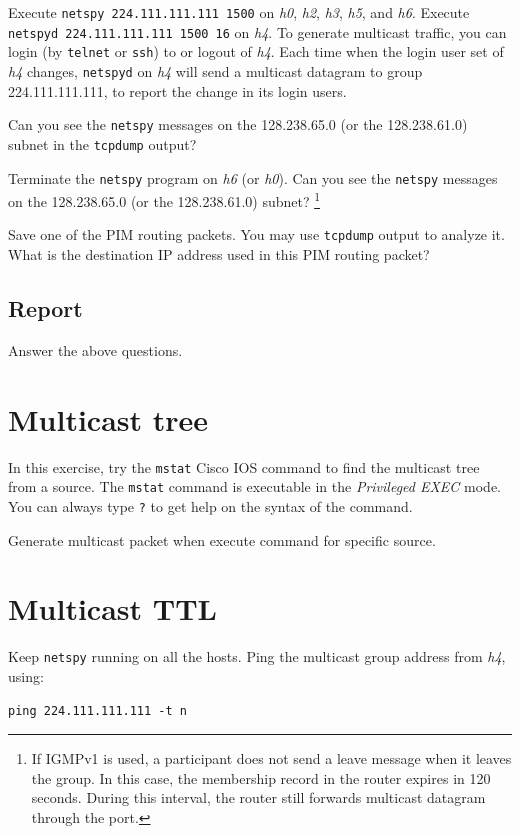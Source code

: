 \documentclass{../UTNetLab}
\begin{document}
    Execute \lstinline{netspy 224.111.111.111 1500} on \textit{h0}, \textit{h2}, \textit{h3}, \textit{h5}, and \textit{h6}.
    Execute \lstinline{netspyd 224.111.111.111 1500 16} on \textit{h4}.
    To generate multicast traffic, you can login (by \lstinline{telnet} or \lstinline{ssh}) to or logout of \textit{h4}.
    Each time when the login user set of \textit{h4} changes, \lstinline{netspyd} on \textit{h4} will send a multicast datagram to group 224.111.111.111, to report the change in its login users.

    Can you see the \lstinline{netspy} messages on the 128.238.65.0 (or the 128.238.61.0) subnet in the \lstinline{tcpdump} output? 

    Terminate the \lstinline{netspy} program on \textit{h6} (or \textit{h0}).
    Can you see the \lstinline{netspy} messages on the 128.238.65.0 (or the 128.238.61.0) subnet?
    \footnote{If IGMPv1 is used, a participant does not send a leave message when it leaves the group.
    In this case, the membership record in the router expires in 120 seconds.
    During this interval, the router still forwards multicast datagram through the port.} 

    Save one of the PIM routing packets.
    You may use \lstinline{tcpdump} output to analyze it.
    What is the destination IP address used in this PIM routing packet?
    
    \subsection*{Report}
    Answer the above questions.

\section{Multicast tree}
    In this exercise, try the \lstinline[language={cisco}]{mstat} Cisco IOS command to find the multicast tree from a source.
    The \lstinline[language={cisco}]{mstat} command is executable in the \textit{Privileged EXEC} mode.
    You can always type \lstinline[language={cisco}]{?} to get help on the syntax of the command.

    Generate multicast packet when execute command for specific source.

\section{Multicast TTL}
    Keep \lstinline{netspy} running on all the hosts.
    Ping the multicast group address from \textit{h4}, using: 
    \begin{lstlisting}[emph={n}]
ping 224.111.111.111 -t n
    \end{lstlisting}
\end{document}

